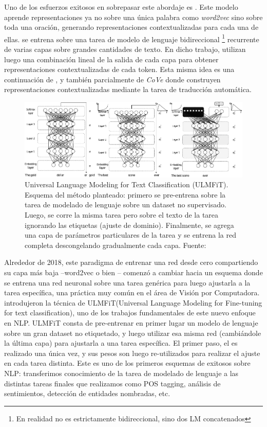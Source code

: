 Uno de los esfuerzos exitosos en sobrepasar este abordaje es \elmo{} \cite{peters2018}. Este modelo aprende representaciones ya no sobre una única palabra como \emph{word2vec} sino sobre toda una oración, generando representaciones contextualizadas para cada una de ellas. \elmo{} se entrena sobre una tarea de modelo de lenguaje bidireccional \footnote{En realidad no es estrictamente bidireccional, sino dos LM concatenados} recurrente de varias capas sobre grandes cantidades de texto. En dicho trabajo, utilizan luego una combinación lineal de la salida de cada capa para obtener representaciones contextualizadas de cada token. Esta misma idea es una continuación de \citet{peters2017semi}, y también parcialmente de \emph{CoVe} \cite{mccann2017learned} donde construyen representaciones contextualizadas mediante la tarea de traducción automática.

\begin{figure}[t]
    \centering
    \includegraphics[width=\textwidth]{img/02/ulmfit.pdf}
    \caption{Universal Language Modeling for Text Classification (ULMFiT). Esquema del método planteado: primero se pre-entrena sobre la tarea de modelado de lenguaje sobre un dataset no supervisado. Luego, se corre la misma tarea pero sobre el texto de la tarea ignorando las etiquetas (ajuste de dominio). Finalmente, se agrega una capa de parámetros particulares de la tarea y se entrena la red completa descongelando gradualmente cada capa. Fuente: \citet{howard-ruder-2018-universal}}
    \label{fig:ulmfit}
\end{figure}

Alrededor de 2018, este paradigma de entrenar una red desde cero compartiendo su capa más baja --word2vec o bien \elmo{}-- comenzó a cambiar hacia un esquema donde se entrena una red neuronal sobre una tarea genérica para luego ajustarla a la tarea específica, una práctica muy común en el área de Visión por Computadora. \citet{howard-ruder-2018-universal} introdujeron la técnica de ULMFiT(Universal Language Modeling for Fine-tuning for text classification), uno de los trabajos fundamentales de este nuevo enfoque en NLP. ULMFiT consta de pre-entrenar en primer lugar un modelo de lenguaje sobre un gran dataset no etiquetado, y luego utilizar esa misma red (cambiándole la última capa) para ajustarla a una tarea específica. El primer paso, el  es realizado una única vez, y sus pesos son luego re-utilizados para realizar el ajuste en cada tarea distinta. Este es uno de los primeros esquemas de  exitosos sobre NLP: transferimos conocimiento de la tarea de modelado de lenguaje a las distintas tareas finales que realizamos como POS tagging, análisis de sentimientos, detección de entidades nombradas, etc.

